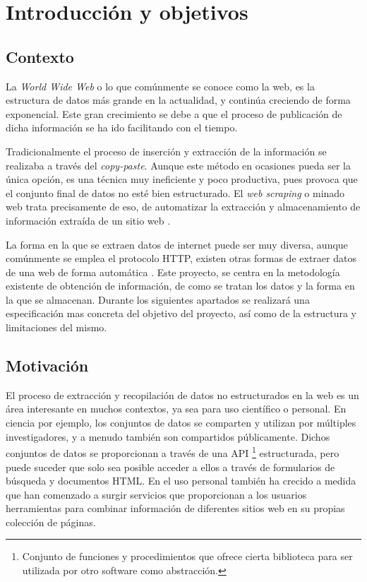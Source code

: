\chapter{Introducción y objetivos}
\label{cha:introduccion y objetivos}

\section{Contexto}
\label{sec:contexto}

La \textit{World Wide Web} o lo que comúnmente se conoce como la web, es la estructura de datos más
grande en la actualidad, y continúa creciendo de forma exponencial. Este gran crecimiento se debe a que el
proceso de publicación de dicha información se ha ido facilitando con el tiempo.

Tradicionalmente el proceso de inserción y extracción de la información se realizaba a través del
\emph{copy-paste}. Aunque este método en ocasiones pueda ser la única opción, es una técnica muy ineficiente 
y poco productiva, pues provoca que el conjunto final de datos no esté bien estructurado. El \emph{web 
scraping} o minado web trata precisamente de eso, de automatizar la extracción y almacenamiento de 
información extraída de un sitio web \cite{Andreas-Mehlfuhrer}.

La forma en la que se extraen datos de internet puede ser muy diversa, aunque comúnmente se emplea el
protocolo HTTP, existen otras formas de extraer datos de una web de forma automática
\cite{web-scraping-bozhao}. Este proyecto, se centra en la metodología existente de obtención de
información, de como se tratan los datos y la forma en la que se almacenan. Durante los siguientes
apartados se realizará una especificación mas concreta del objetivo del proyecto, así como de la
estructura y limitaciones del mismo.

\section{Motivación}
\label{sec:motivacion}

El proceso de extracción y recopilación de datos no estructurados en la web es un área interesante en
muchos contextos, ya sea para uso científico o personal. En ciencia por ejemplo, los conjuntos de datos
se comparten y utilizan por múltiples investigadores, y a menudo también  son compartidos públicamente.
Dichos conjuntos de datos se proporcionan a través de una API \footnote{Conjunto de funciones
y procedimientos que ofrece cierta biblioteca para ser utilizada por otro software como abstracción.} 
estructurada, pero puede suceder que solo sea posible acceder a ellos a través de formularios de búsqueda 
y documentos HTML. En el uso personal también ha crecido a medida que han comenzado a surgir servicios que 
proporcionan a los usuarios herramientas para combinar información de diferentes sitios web en su propias 
colección de páginas.

